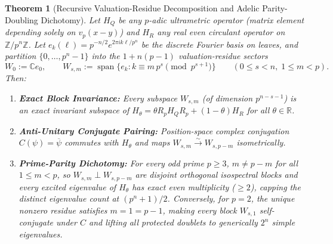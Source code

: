 \documentclass[11pt,a4paper]{article}
\numberwithin{equation}{section}
\theoremstyle{plain}
\newtheorem{theorem}{Theorem}[section]
\theoremstyle{definition}
\theoremstyle{remark}
\newcommand{\Z}{\mathbb{Z}}
\newcommand{\R}{\mathbb{R}}
\newcommand{\C}{\mathbb{C}}
\begin{document}
\begin{theorem}[Recursive Valuation-Residue Decomposition and Adelic Parity-Doubling Dichotomy]
\label{thm:adelic}
Let $H_Q$ be any $p$-adic ultrametric operator (matrix element depending solely on $v_p(x-y)$) and $H_R$ any real even circulant operator on $\Z / p^n\Z$. Let $e_k(\ell) = p^{-n/2} e^{2\pi i k \ell / p^n}$ be the discrete Fourier basis on leaves, and partition $\{0,\dots,p^n-1\}$ into the $1 + n(p-1)$ valuation-residue sectors
\begin{equation}
  W_0 := \C e_0, \qquad
  W_{s,m} := \operatorname{span}\!\bigl\{e_k : k \equiv m \, p^s \pmod{p^{s+1}}\bigr\}
  \qquad (0 \le s < n,\; 1 \le m < p).
  \label{eq:sectors}
\end{equation}
Then:
\begin{enumerate}[leftmargin=1.8em,itemsep=2pt]
  \item \textbf{Exact Block Invariance:} Every subspace $W_{s,m}$ (of dimension $p^{n-s-1}$) is an exact invariant subspace of $H_\theta = \theta R_p H_Q R_p + (1-\theta) H_R$ for all $\theta \in \R$.
  \item \textbf{Anti-Unitary Conjugate Pairing:} Position-space complex conjugation $C(\psi) = \overline{\psi}$ commutes with $H_\theta$ and maps $W_{s,m} \xrightarrow{\sim} W_{s, p-m}$ isometrically.
  \item \textbf{Prime-Parity Dichotomy:} For every odd prime $p \ge 3$, $m \ne p - m$ for all $1 \le m < p$, so $W_{s,m} \perp W_{s,p-m}$ are disjoint orthogonal isospectral blocks and every excited eigenvalue of $H_\theta$ has exact even multiplicity ($\ge 2$), capping the distinct eigenvalue count at $(p^n + 1)/2$. Conversely, for $p = 2$, the unique nonzero residue satisfies $m = 1 = p - 1$, making every block $W_{s,1}$ self-conjugate under $C$ and lifting all protected doublets to generically $2^n$ simple eigenvalues.
\end{enumerate}
\end{theorem}
\end{document}
